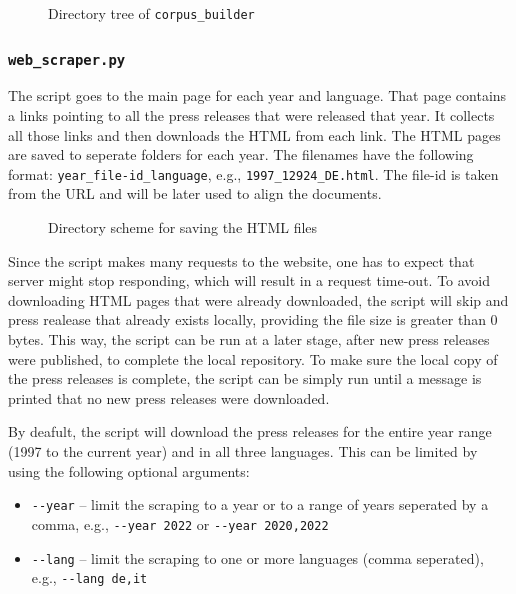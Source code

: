 \begin{figure}

\caption{Directory tree of \texttt{corpus\_builder}}
\end{figure} 
\subsubsection{\texttt{web\_scraper.py}}
The script goes to the main page for each year and language. 
That page contains a links pointing to all the press releases that were released that year. 
It collects all those links and then downloads the HTML from each link. 
The HTML pages are saved to seperate folders for each year. 
The filenames have the following format: \texttt{year\_file-id\_language}, e.g., \texttt{1997\_12924\_DE.html}. 
The file-id is taken from the URL and will be later used to align the documents. 


\begin{figure}
\caption{Directory scheme for saving the HTML files}
\label{fig:html-scheme}
\end{figure} 

Since the script makes many requests to the website, one has to expect that server might stop responding, which will result in a request time-out. 
To avoid downloading HTML pages that were already downloaded, the script will skip and press realease that already exists locally, providing the file size is greater than 0 bytes.
This way, the script can be run at a later stage, after new press releases were published, to complete the local repository.
To make sure the local copy of the press releases is complete, the script can be simply run until a message is printed that no new press releases were downloaded. 

By deafult, the script will download the press releases for the entire year range (1997 to the current year) and in all three languages. 
This can be limited by using the following optional arguments:
\begin{itemize}
	\item \texttt{-{}-year} -- limit the scraping to a year or to a range of years seperated by a comma, e.g., \texttt{-{}-year 2022} or \texttt{-{}-year 2020,2022}
	\item \texttt{-{}-lang} -- limit the scraping to one or more languages (comma seperated), e.g., \texttt{-{}-lang de,it}
\end{itemize}

